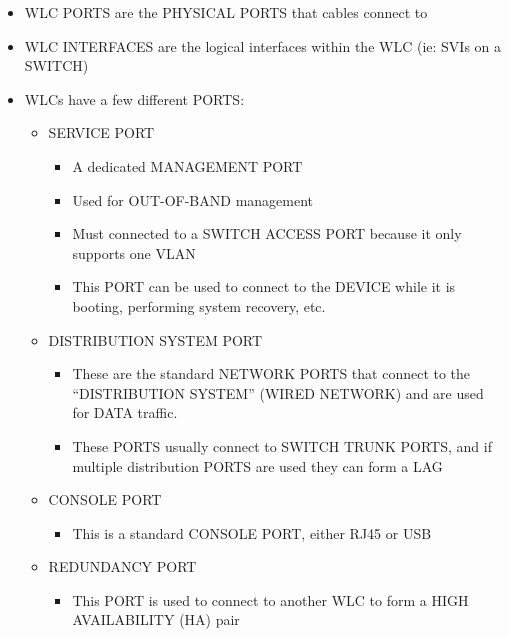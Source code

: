 \begin{itemize}
\tightlist
\item
  WLC PORTS are the PHYSICAL PORTS that cables connect to
\item
  WLC INTERFACES are the logical interfaces within the WLC (ie: SVIs on
  a SWITCH)
\item
  WLCs have a few different PORTS:

  \begin{itemize}
  \tightlist
  \item
    SERVICE PORT

    \begin{itemize}
    \tightlist
    \item
      A dedicated MANAGEMENT PORT
    \item
      Used for OUT-OF-BAND management
    \item
      Must connected to a SWITCH ACCESS PORT because it only supports
      one VLAN
    \item
      This PORT can be used to connect to the DEVICE while it is
      booting, performing system recovery, etc.
    \end{itemize}
  \item
    DISTRIBUTION SYSTEM PORT

    \begin{itemize}
    \tightlist
    \item
      These are the standard NETWORK PORTS that connect to the
      ``DISTRIBUTION SYSTEM'' (WIRED NETWORK) and are used for DATA
      traffic.
    \item
      These PORTS usually connect to SWITCH TRUNK PORTS, and if multiple
      distribution PORTS are used they can form a LAG
    \end{itemize}
  \item
    CONSOLE PORT

    \begin{itemize}
    \tightlist
    \item
      This is a standard CONSOLE PORT, either RJ45 or USB
    \end{itemize}
  \item
    REDUNDANCY PORT

    \begin{itemize}
    \tightlist
    \item
      This PORT is used to connect to another WLC to form a HIGH
      AVAILABILITY (HA) pair
    \end{itemize}
  \end{itemize}
\end{itemize}

